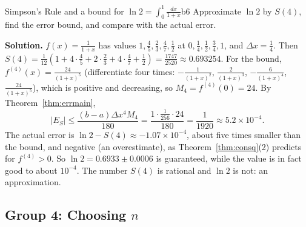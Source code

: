 \documentclass[11pt]{article}
\begin{document}
\begin{exmp}{Simpson's Rule and a bound for $\ln2=\int_0^1\frac{dx}{1+x}$}{b6}
Approximate $\ln2$ by $S(4)$, find the error bound, and compare with the actual error.

\textbf{Solution.} $f(x)=\frac1{1+x}$ has values $1,\frac45,\frac23,\frac47,\frac12$ at $0,\frac14,\frac12,\frac34,1$, and $\Delta x=\frac14$. Then $S(4)=\frac1{12}\left(1+4\cdot\frac45+2\cdot\frac23+4\cdot\frac47+\frac12\right)=\frac{1747}{2520}\approx0.693254$. For the bound, $f^{(4)}(x)=\frac{24}{(1+x)^5}$ (differentiate four times: $-\frac1{(1+x)^2}$, $\frac2{(1+x)^3}$, $-\frac6{(1+x)^4}$, $\frac{24}{(1+x)^5}$), which is positive and decreasing, so $M_4=f^{(4)}(0)=24$. By Theorem~\ref{thm:errmain},
\[\lvert E_S\rvert\le\frac{(b-a)\Delta x^4M_4}{180}=\frac{1\cdot\frac1{256}\cdot24}{180}=\frac1{1920}\approx5.2\times10^{-4}.\]
The actual error is $\ln2-S(4)\approx-1.07\times10^{-4}$, about five times smaller than the bound, and negative (an overestimate), as Theorem~\ref{thm:consq}(2) predicts for $f^{(4)}>0$. So $\ln2=0.6933\pm0.0006$ is guaranteed, while the value is in fact good to about $10^{-4}$. The number $S(4)$ is rational and $\ln2$ is not: an approximation.
\end{exmp}

\subsection*{Group 4: Choosing $n$}
\end{document}
